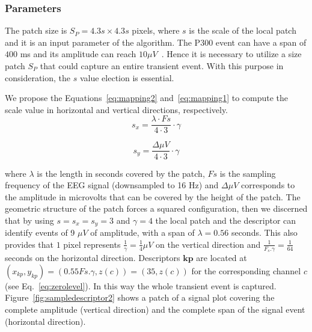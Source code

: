 \documentclass[entropy,article,submit,moreauthors,pdftex,10pt,a4paper]{mdpi}
\begin{document}


\subsubsection{Parameters}

The patch size is $S_P = 4.3s \times 4.3s$ pixels, where $s$ is the scale of the local patch and it is an input parameter of the algorithm. The P300 event can have a span of $400$ ms and its amplitude can reach $ 10 \mu V $~\citep{Rao2013}.  Hence it is necessary to utilize a size patch $S_P$ that could capture an entire transient event. With this purpose in consideration, the $s$ value election is essential.

We propose the Equations~\ref{eq:mapping2} and~\ref{eq:mapping1} to compute the scale value in horizontal and vertical directions, respectively. 
\begin{equation}
s_x = \frac{\lambda \cdot Fs}{4 \cdot 3} \cdot \gamma
\label{eq:mapping2}
\end{equation}

\begin{equation}
s_y= \frac{\Delta \mu V}{4 \cdot 3} \cdot \gamma 
\label{eq:mapping1}
\end{equation}


\noindent where $ \lambda $ is the length in seconds covered by the patch, $ Fs $ is the sampling frequency of the EEG signal (downsampled to 16 Hz) and  $\Delta  \mu V $ corresponds to the amplitude in microvolts that can be covered by the height of the patch. The geometric structure of the patch forces a squared configuration, then we discerned that by using $ s =s_x =s_y = 3 $ and $ \gamma = 4 $  the local patch and the descriptor can identify events of 9 $ \mu V $ of amplitude, with a span of $ \lambda = 0.56$ seconds.  This also provides that $ 1 $ pixel represents $ \frac{1}{\gamma}= \frac{1}{4} \mu V $ on the vertical direction and $\frac{1}{F_s.\gamma}=\frac{1}{64}$ seconds on the horizontal direction. Descriptors  $\mathbf{kp}$  are located at $ (x_{kp}, y_{kp} )= ( 0.55 Fs.\gamma, z(c) )= (35,  z(c)) $ for the corresponding channel $c$ (see Eq.~\ref{eq:zerolevel}).   In this way the whole transient event is captured. 
Figure~\ref{fig:sampledescriptor2} shows a patch of a signal plot covering the complete amplitude (vertical direction) and the complete span of the signal event (horizontal direction). 
\end{document}
